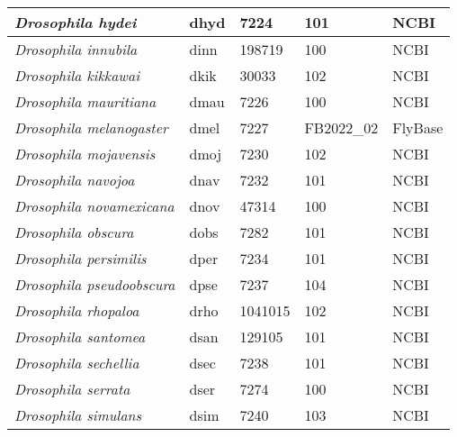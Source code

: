\documentclass[10pt,letterpaper]{article}
\begin{document}
\begin{table}[h!]
\begin{tabular}{|l|l|l|l|l|}
\textit{Drosophila hydei}              & dhyd                & 7224              & 101              & NCBI            \\ \hline
\textit{Drosophila innubila}           & dinn                & 198719            & 100              & NCBI            \\ \hline
\textit{Drosophila kikkawai}           & dkik                & 30033             & 102              & NCBI            \\ \hline
\textit{Drosophila mauritiana}         & dmau                & 7226              & 100              & NCBI            \\ \hline
\textit{Drosophila melanogaster}       & dmel                & 7227              & FB2022\_02       & FlyBase         \\ \hline
\textit{Drosophila mojavensis}         & dmoj                & 7230              & 102              & NCBI            \\ \hline
\textit{Drosophila navojoa}            & dnav                & 7232              & 101              & NCBI            \\ \hline
\textit{Drosophila novamexicana}       & dnov                & 47314             & 100              & NCBI            \\ \hline
\textit{Drosophila obscura}            & dobs                & 7282              & 101              & NCBI            \\ \hline
\textit{Drosophila persimilis}         & dper                & 7234              & 101              & NCBI            \\ \hline
\textit{Drosophila pseudoobscura}      & dpse                & 7237              & 104              & NCBI            \\ \hline
\textit{Drosophila rhopaloa}           & drho                & 1041015           & 102              & NCBI            \\ \hline
\textit{Drosophila santomea}           & dsan                & 129105            & 101              & NCBI            \\ \hline
\textit{Drosophila sechellia}          & dsec                & 7238              & 101              & NCBI            \\ \hline
\textit{Drosophila serrata}            & dser                & 7274              & 100              & NCBI            \\ \hline
\textit{Drosophila simulans}           & dsim                & 7240              & 103              & NCBI            \\ \hline

\end{tabular}
\end{table}
\end{document}
